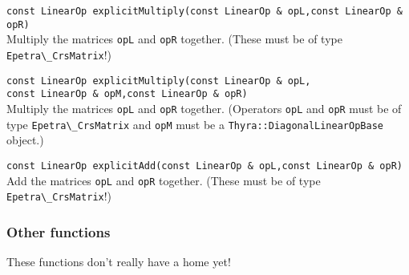 \documentclass[12pt]{article}
\newcommand{\code}[1]{\lstinline[basicstyle=\footnotesize]!#1!}
\newcommand{\scode}[1]{\lstinline[basicstyle=\small\bfseries]!#1!}
\begin{document}
\begin{framed}
\begin{flushleft}
\scode{const LinearOp explicitMultiply(const LinearOp & opL,const LinearOp & opR)} \\
Multiply the matrices \code{opL} and \code{opR} together. (These must be
of type \code{Epetra\_CrsMatrix}!)

\vspace{10pt}
\scode{const LinearOp explicitMultiply(const LinearOp & opL,} \\
\hspace{148pt}\code{const LinearOp & opM,const LinearOp & opR)} \\
Multiply the matrices \code{opL} and \code{opR} together. (Operators \code{opL} and \code{opR}
must be of type \code{Epetra\_CrsMatrix} and \code{opM} must be a \code{Thyra::DiagonalLinearOpBase}
object.)

\vspace{10pt}
\scode{const LinearOp explicitAdd(const LinearOp & opL,const LinearOp & opR)} \\
Add the matrices \code{opL} and \code{opR} together. (These must be
of type \code{Epetra\_CrsMatrix}!)
\end{flushleft}
\end{framed}

\subsubsection{Other functions}
These functions don't really have a home yet!
\end{document}
